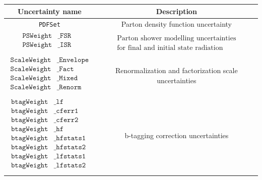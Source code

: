 \begin{table}[h!]
	\centering
	\begin{tabular}{cc}
		Uncertainty name               & Description \\
		
		\hline
		\texttt{PDFSet} & Parton density function uncertainty \\
		
		\hline
		$\begin{aligned}
			\texttt{PSWeight}&\texttt{\_FSR} & \\
			\texttt{PSWeight}&\texttt{\_ISR} & \\
		\end{aligned}$ & $\begin{array}{c}
			\text{Parton shower modelling uncertainties} \\
			\text{for final and initial state radiation}
		\end{array}$ \\
		
		\hline
		$\begin{aligned}	
			\texttt{ScaleWeight}&\texttt{\_Envelope} \\
			\texttt{ScaleWeight}&\texttt{\_Fact    } \\
			\texttt{ScaleWeight}&\texttt{\_Mixed   } \\
			\texttt{ScaleWeight}&\texttt{\_Renorm  } \\
		\end{aligned}$ & Renormalization and factorization scale uncertainties \\
		
		\hline
		$\begin{aligned}
			\texttt{btagWeight}&\texttt{\_lf       } \\
			\texttt{btagWeight}&\texttt{\_cferr1   } \\
			\texttt{btagWeight}&\texttt{\_cferr2   } \\
			\texttt{btagWeight}&\texttt{\_hf       } \\
			\texttt{btagWeight}&\texttt{\_hfstats1 } \\
			\texttt{btagWeight}&\texttt{\_hfstats2 } \\
			\texttt{btagWeight}&\texttt{\_lfstats1 } \\
			\texttt{btagWeight}&\texttt{\_lfstats2 } \\
		\end{aligned}$ & b-tagging correction uncertainties \\
		

\end{tabular}
\end{table}
